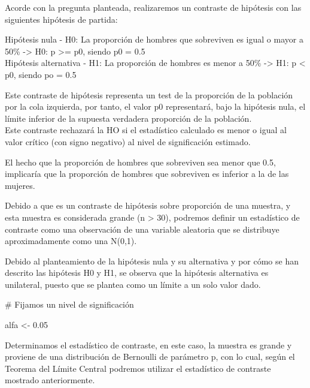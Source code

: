 \documentclass[
]{article}
\newenvironment{Shaded}{\begin{snugshade}}{\end{snugshade}}
\newcommand{\CommentTok}[1]{\textcolor[rgb]{0.50,0.62,0.50}{#1}}
\newcommand{\FloatTok}[1]{\textcolor[rgb]{0.75,0.75,0.82}{#1}}
\newcommand{\NormalTok}[1]{\textcolor[rgb]{0.80,0.80,0.80}{#1}}
\newcommand{\StringTok}[1]{\textcolor[rgb]{0.80,0.58,0.58}{#1}}
\begin{document}
Acorde con la pregunta planteada, realizaremos un contraste de hipótesis
con las siguientes hipótesis de partida:

Hipótesis nula - H0: La proporción de hombres que sobreviven es igual o
mayor a 50\% -\textgreater{} H0: p \textgreater= p0, siendo p0 = 0.5\\
Hipótesis alternativa - H1: La proporción de hombres es menor a 50\%
-\textgreater{} H1: p \textless{} p0, siendo po = 0.5

Este contraste de hipótesis representa un test de la proporción de la
población por la cola izquierda, por tanto, el valor p0 representará,
bajo la hipótesis nula, el límite inferior de la supuesta verdadera
proporción de la población.\\
Este contraste rechazará la HO si el estadístico calculado es menor o
igual al valor crítico (con signo negativo) al nivel de significación
estimado.

El hecho que la proporción de hombres que sobreviven sea menor que 0.5,
implicaría que la proporción de hombres que sobreviven es inferior a la
de las mujeres.

Debido a que es un contraste de hipótesis sobre proporción de una
muestra, y esta muestra es considerada grande (n \textgreater{} 30),
podremos definir un estadístico de contraste como una observación de una
variable aleatoria que se distribuye aproximadamente como una N(0,1).

Debido al planteamiento de la hipótesis nula y su alternativa y por cómo
se han descrito las hipótesis H0 y H1, se observa que la hipótesis
alternativa es unilateral, puesto que se plantea como un límite a un
solo valor dado.

\begin{Shaded}
\begin{Highlighting}[]
\CommentTok{# Fijamos un nivel de significación}

\NormalTok{alfa <-}\StringTok{ }\FloatTok{0.05}
\end{Highlighting}
\end{Shaded}

Determinamos el estadístico de contraste, en este caso, la muestra es
grande y proviene de una distribución de Bernoulli de parámetro p, con
lo cual, según el Teorema del Límite Central podremos utilizar el
estadístico de contraste mostrado anteriormente.
\end{document}
